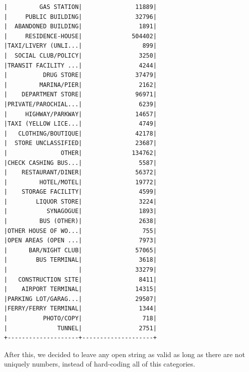 \documentclass{article}
\begin{document}
\begin{itemize}
\begin{verbatim}
|         GAS STATION|               11889|
|     PUBLIC BUILDING|               32796|
|  ABANDONED BUILDING|                1891|
|     RESIDENCE-HOUSE|              504402|
|TAXI/LIVERY (UNLI...|                 899|
|  SOCIAL CLUB/POLICY|                3250|
|TRANSIT FACILITY ...|                4244|
|          DRUG STORE|               37479|
|         MARINA/PIER|                2162|
|    DEPARTMENT STORE|               96971|
|PRIVATE/PAROCHIAL...|                6239|
|     HIGHWAY/PARKWAY|               14657|
|TAXI (YELLOW LICE...|                4749|
|   CLOTHING/BOUTIQUE|               42178|
|  STORE UNCLASSIFIED|               23687|
|               OTHER|              134762|
|CHECK CASHING BUS...|                5587|
|    RESTAURANT/DINER|               56372|
|         HOTEL/MOTEL|               19772|
|    STORAGE FACILITY|                4599|
|        LIQUOR STORE|                3224|
|           SYNAGOGUE|                1893|
|         BUS (OTHER)|                2638|
|OTHER HOUSE OF WO...|                 755|
|OPEN AREAS (OPEN ...|                7973|
|      BAR/NIGHT CLUB|               57065|
|        BUS TERMINAL|                3618|
|                    |               33279|
|   CONSTRUCTION SITE|                8411|
|    AIRPORT TERMINAL|               14315|
|PARKING LOT/GARAG...|               29507|
|FERRY/FERRY TERMINAL|                1344|
|          PHOTO/COPY|                 718|
|              TUNNEL|                2751|
+--------------------+--------------------+
\end{verbatim}

After this, we decided to leave any open string as valid as long as there are not uniquely numbers, instead of hard-coding all of this categories. 


\end{itemize}
\end{document}
